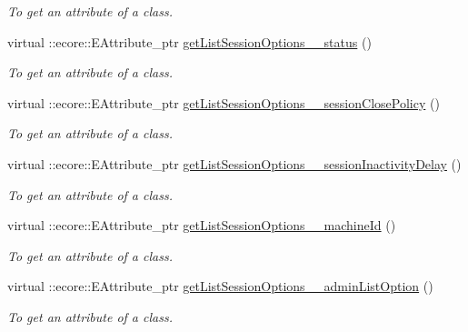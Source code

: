 \begin{DoxyCompactItemize}
\begin{DoxyCompactList}\small\item\em To get an attribute of a class. \item\end{DoxyCompactList}\item 
virtual ::ecore::EAttribute\_\-ptr \hyperlink{classUMS__Data_1_1UMS__DataPackage_a55cd49994293b88ea4c7de9a3d7a0ba1}{getListSessionOptions\_\-\_\-status} ()
\begin{DoxyCompactList}\small\item\em To get an attribute of a class. \item\end{DoxyCompactList}\item 
virtual ::ecore::EAttribute\_\-ptr \hyperlink{classUMS__Data_1_1UMS__DataPackage_af150aaf6bbb5070a6b453d7771d005bb}{getListSessionOptions\_\-\_\-sessionClosePolicy} ()
\begin{DoxyCompactList}\small\item\em To get an attribute of a class. \item\end{DoxyCompactList}\item 
virtual ::ecore::EAttribute\_\-ptr \hyperlink{classUMS__Data_1_1UMS__DataPackage_ab1c1d5cdfa7f4be931fe4506146d84ae}{getListSessionOptions\_\-\_\-sessionInactivityDelay} ()
\begin{DoxyCompactList}\small\item\em To get an attribute of a class. \item\end{DoxyCompactList}\item 
virtual ::ecore::EAttribute\_\-ptr \hyperlink{classUMS__Data_1_1UMS__DataPackage_aa37f91c51962a12452b39ff2a7f8d161}{getListSessionOptions\_\-\_\-machineId} ()
\begin{DoxyCompactList}\small\item\em To get an attribute of a class. \item\end{DoxyCompactList}\item 
virtual ::ecore::EAttribute\_\-ptr \hyperlink{classUMS__Data_1_1UMS__DataPackage_a870dbc55d196829e2cade4ddfa3569a3}{getListSessionOptions\_\-\_\-adminListOption} ()
\begin{DoxyCompactList}\small\item\em To get an attribute of a class. \item\end{DoxyCompactList}\item 

\end{DoxyCompactItemize}
